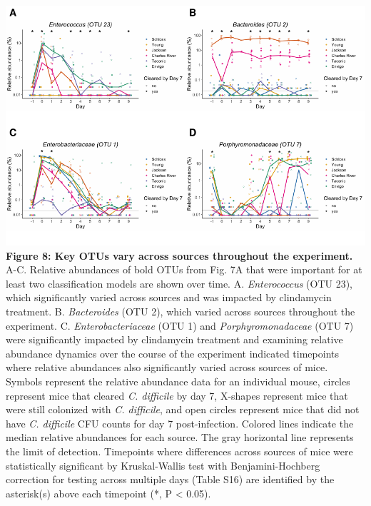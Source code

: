 \documentclass[11pt,]{article}
\begin{document}
\newpage

\includegraphics{figure_8.pdf} \textbf{Figure 8: Key OTUs vary across
sources throughout the experiment.} A-C. Relative abundances of bold
OTUs from Fig. 7A that were important for at least two classification
models are shown over time. A. \emph{Enterococcus} (OTU 23), which
significantly varied across sources and was impacted by clindamycin
treatment. B. \emph{Bacteroides} (OTU 2), which varied across sources
throughout the experiment. C. \emph{Enterobacteriaceae} (OTU 1) and
\emph{Porphyromonadaceae} (OTU 7) were significantly impacted by
clindamycin treatment and examining relative abundance dynamics over the
course of the experiment indicated timepoints where relative abundances
also significantly varied across sources of mice. Symbols represent the
relative abundance data for an individual mouse, circles represent mice
that cleared \emph{C. difficile} by day 7, X-shapes represent mice that
were still colonized with \emph{C. difficile}, and open circles
represent mice that did not have \emph{C. difficile} CFU counts for day
7 post-infection. Colored lines indicate the median relative abundances
for each source. The gray horizontal line represents the limit of
detection. Timepoints where differences across sources of mice were
statistically significant by Kruskal-Wallis test with Benjamini-Hochberg
correction for testing across multiple days (Table S16) are identified
by the asterisk(s) above each timepoint (*, P \textless{} 0.05).

\newpage
\end{document}
